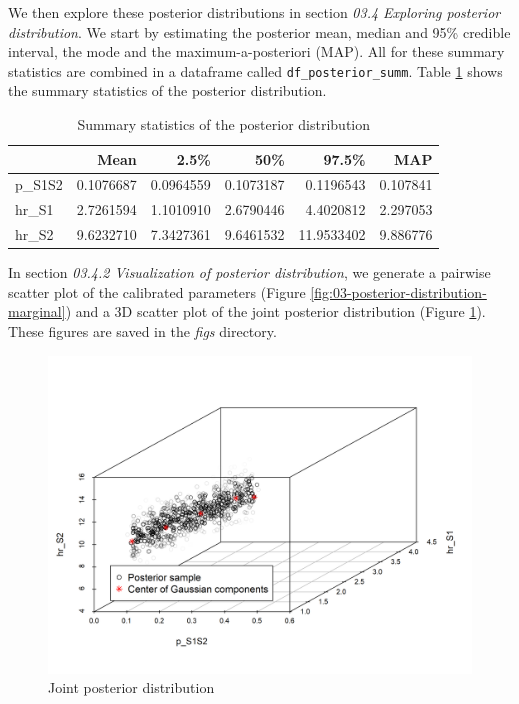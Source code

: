 \documentclass[]{book}
\begin{document}
We then explore these posterior distributions in section \emph{03.4 Exploring posterior distribution}. We start by estimating the posterior mean, median and 95\% credible interval, the mode and the maximum-a-posteriori (MAP). All for these summary statistics are combined in a dataframe called \texttt{df\_posterior\_summ}. Table \ref{tab:SummaryCal} shows the summary statistics of the posterior distribution.

\begin{table}[t]

\caption{\label{tab:SummaryCal}Summary statistics of the posterior distribution}
\centering
\begin{tabular}{l|r|r|r|r|r}
\hline
  & Mean & 2.5\% & 50\% & 97.5\% & MAP\\
\hline
p\_S1S2 & 0.1076687 & 0.0964559 & 0.1073187 & 0.1196543 & 0.107841\\
\hline
hr\_S1 & 2.7261594 & 1.1010910 & 2.6790446 & 4.4020812 & 2.297053\\
\hline
hr\_S2 & 9.6232710 & 7.3427361 & 9.6461532 & 11.9533402 & 9.886776\\
\hline
\end{tabular}
\end{table}

In section \emph{03.4.2 Visualization of posterior distribution}, we generate a pairwise scatter plot of the calibrated parameters (Figure \ref{fig:03-posterior-distribution-marginal}) and a 3D scatter plot of the joint posterior distribution (Figure \ref{fig:Posterior-distribution-joint}). These figures are saved in the \emph{figs} directory.

\begin{figure}

{\centering \includegraphics[width=1\linewidth]{../figs/03_posterior_distribution_joint} 

}

\caption{Joint posterior distribution}\label{fig:Posterior-distribution-joint}
\end{figure}
\end{document}
